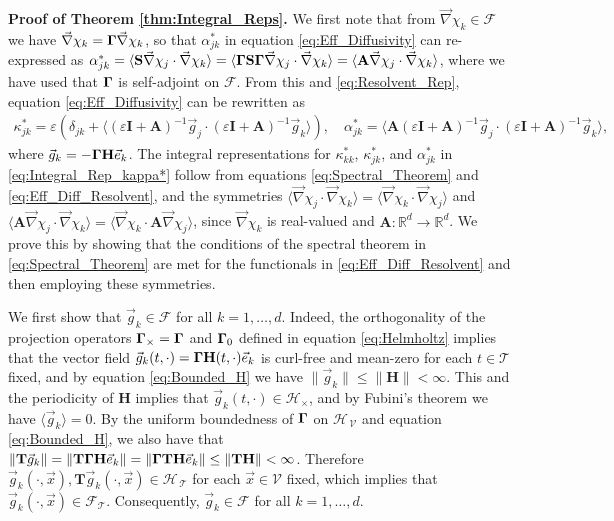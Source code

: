\documentclass[11pt]{amsart}
\newcommand{\Tb}{\mathbf{T}}
\newcommand{\Hb}{\mathbf{H}}
\newcommand{\Ib}{\mathbf{I}}
\newcommand{\Sb}{\mathbf{S}}
\newcommand{\Ab}{\mathbf{A}}
\newcommand{\Tc}{\mathcal{T}}
\newcommand{\Vc}{\mathcal{V}}
\newcommand{\Hs}{\mathscr{H}}
\newcommand{\Fs}{\mathscr{F}}
\newcommand\bGamma{\mbox{\boldmath${\Gamma}$}}
\begin{document}
\textbf{Proof of Theorem \ref{thm:Integral_Reps}.}\hspace{1ex}
%
We first note that from $\vec{\nabla}\chi_k\in\Fs$ we have 
$\vec{\nabla}\chi_k=\bGamma\vec{\nabla}\chi_k$, so that $\alpha^*_{jk}$ in equation
\eqref{eq:Eff_Diffusivity} can re-expressed as
$\alpha^*_{jk}=\langle\Sb\vec{\nabla}\chi_j\cdot\vec{\nabla}\chi_k\rangle=\langle\bGamma\Sb\bGamma\vec{\nabla}\chi_j\cdot\vec{\nabla}\chi_k\rangle  
=\langle\Ab\vec{\nabla}\chi_j\cdot\vec{\nabla}\chi_k\rangle$, where we have used that $\bGamma$ is
self-adjoint on $\Fs$. From this and \eqref{eq:Resolvent_Rep},
equation \eqref{eq:Eff_Diffusivity} can be rewritten as
%
\begin{align}\label{eq:Eff_Diff_Resolvent}
 \kappa^*_{jk}=\varepsilon\left(\delta_{jk}+\langle(\varepsilon\Ib+\Ab)^{-1}\vec{g}_j\cdot(\varepsilon\Ib+\Ab)^{-1}\vec{g}_k\rangle\right), \quad
 \alpha^*_{jk}=\langle\Ab(\varepsilon\Ib+\Ab)^{-1}\vec{g}_j\cdot(\varepsilon\Ib+\Ab)^{-1}\vec{g}_k\rangle,
\end{align}
%
where $\vec{g}_k=-\bGamma\Hb\vec{e}_k$. The integral representations
for $\kappa^*_{kk}$, $\kappa^*_{jk}$, and $\alpha^*_{jk}$ in \eqref{eq:Integral_Rep_kappa*} follow
from equations \eqref{eq:Spectral_Theorem} and
\eqref{eq:Eff_Diff_Resolvent}, and the symmetries
$\langle\vec{\nabla}\chi_j\cdot\vec{\nabla}\chi_k\rangle=\langle\vec{\nabla}\chi_k\cdot\vec{\nabla}\chi_j\rangle$ and 
$\langle\Ab\vec{\nabla}\chi_j\cdot\vec{\nabla}\chi_k\rangle=\langle\vec{\nabla}\chi_k\cdot\Ab\vec{\nabla}\chi_j\rangle$, since
$\vec{\nabla}\chi_k$ is real-valued and $\Ab:\mathbb{R}^d\to\mathbb{R}^d$. We
prove this by showing that the conditions of the spectral theorem in 
\eqref{eq:Spectral_Theorem} are met for the functionals in
\eqref{eq:Eff_Diff_Resolvent} and then employing these symmetries.   





We first show that $\vec{g}_k\in\Fs$ for
all $k=1,\ldots,d$. Indeed, the orthogonality of the
projection operators $\bGamma_\times=\bGamma$ and $\bGamma_0$ defined in
equation \eqref{eq:Helmholtz} implies that the vector field
$\vec{g}_k(t,\cdot)=\bGamma\Hb(t,\cdot)\vec{e}_k$ is curl-free and mean-zero
for each $t\in\Tc$ fixed, and by equation \eqref{eq:Bounded_H} 
we have $\|\vec{g}_k\|\leq\|\Hb\|<\infty$. This and the periodicity of $\Hb$ implies
that $\vec{g}_k(t,\cdot)\in\Hs_\times$, and by Fubini's theorem \cite{Folland:99}
we have $\langle\vec{g}_k\rangle=0$.  By the uniform boundedness of $\bGamma$ on
$\Hs_{\,\Vc}$ and equation \eqref{eq:Bounded_H}, we also have
\cite{Folland:99} that
$\|\Tb\vec{g}_k\|=\|\Tb\bGamma\Hb\vec{e}_k\|=\|\bGamma\Tb\Hb\vec{e}_k\|\leq\|\Tb\Hb\|<\infty$.   
Therefore $\vec{g}_k(\cdot,\vec{x}),\Tb\vec{g}_k(\cdot,\vec{x})\in\Hs_{\,\Tc}$ for each
$\vec{x}\in\Vc$ fixed, which implies that
$\vec{g}_k(\cdot,\vec{x})\in\Fs_{\Tc}$. Consequently,  $\vec{g}_k\in\Fs$ for
all $k=1,\ldots,d$.
\end{document}

